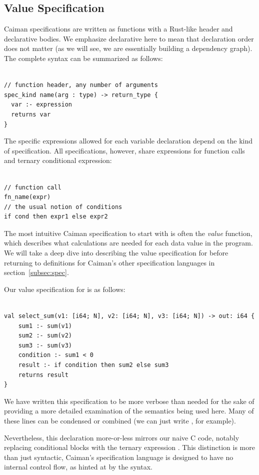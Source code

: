 \subsection{Value Specification}
\label{subsec:value}

Caiman specifications are written as functions with a Rust-like header and declarative bodies.  We emphasize declarative here to mean that declaration order does not matter (as we will see, we are essentially building a dependency graph).  The complete syntax can be summarized as follows:
%
\begin{lstlisting}

// function header, any number of arguments
spec_kind name(arg : type) -> return_type {
  var :- expression
  returns var
}
\end{lstlisting}
%
The specific expressions allowed for each variable declaration depend on the kind of specification.  All specifications, however, share expressions for function calls and ternary conditional expression:
%
\begin{lstlisting}

// function call
fn_name(expr)
// the usual notion of conditions
if cond then expr1 else expr2
\end{lstlisting}
%
The most intuitive Caiman specification to start with is often the \textit{value} function, which describes what calculations are needed for each data value in the program.  We will take a deep dive into describing the value specification for  before returning to definitions for Caiman's other specification languages in section~\ref{subsec:spec}.  

Our value specification for  is as follows:
%
\begin{lstlisting}

val select_sum(v1: [i64; N], v2: [i64; N], v3: [i64; N]) -> out: i64 {
    sum1 :- sum(v1)
    sum2 :- sum(v2)
    sum3 :- sum(v3)
    condition :- sum1 < 0
    result :- if condition then sum2 else sum3
    returns result
}
\end{lstlisting}
%
We have written this specification to be more verbose than needed for the sake of providing a more detailed examination of the semantics being used here.  Many of these lines can be condensed or combined (we can just write , for example).

Nevertheless, this declaration more-or-less mirrors our naive C code, notably replacing conditional  blocks with the ternary expression .  This distinction is more than just syntactic, Caiman's specification language is designed to have no internal control flow, as hinted at by the syntax.

